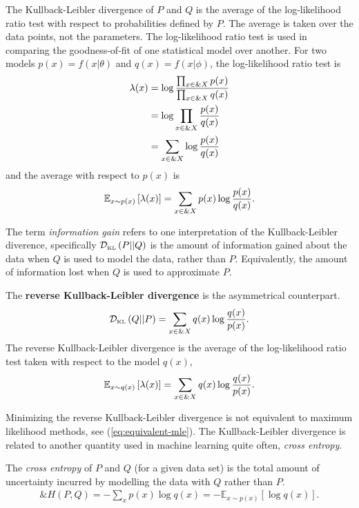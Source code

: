 \begin{remark}
  The Kullback-Leibler divergence of $P$ and $Q$ is the average of the
  log-likelihood ratio test with respect to probabilities defined by $P$. The
  average is taken over the data points, not the parameters. The log-likelihood
  ratio test is used in comparing the goodness-of-fit of one statistical model
  over another. For two models $p(x) = f(x|\theta)$ and $q(x) = f(x|\phi)$,
  the log-likelihood ratio test is
  \begin{align}
    \lambda(x) & = \log{\prod_{x \in \&X} p(x) \over \prod_{x \in \&X} q(x)} \\
               & = \log \prod_{x \in \&X} {p(x) \over q(x)} \\
               & = \sum_{x \in \&X} \log {p(x) \over q(x)}
  \end{align}
  and the average with respect to $p(x)$ is
  \begin{align}
    \mathbb{E}_{x \sim p(x)}\left[ \lambda(x) \right] = \sum_{x \in \&X} p(x)\log {p(x) \over q(x)}.
  \end{align}
\end{remark}
The term \textit{information gain} refers to one interpretation of the
Kullback-Leibler diverence, specifically $\mathcal{D}_{\text{\tiny KL}}\left( P \middle| \middle| Q \right)$ is the amount of
information gained about the data when $Q$ is used to model the data, rather
than $P$.  Equivalently, the amount of information lost when $Q$ is used to
approximate $P$.

\begin{definition}
  The \textbf{reverse Kullback-Leibler divergence} is the asymmetrical
  counterpart.
  \begin{align}
    \label{eq:reverse-KL}
    \mathcal{D}_{\text{\tiny KL}}\left( Q \middle| \middle| P \right) = \sum_{x \in \&X} q(x) \log{q(x) \over p(x)}.
  \end{align}
  The reverse Kullback-Leibler divergence is the average of the log-likelihood
  ratio test taken with respect to the model $q(x)$,
  \begin{align}
    \mathbb{E}_{x \sim q(x)}\left[ \lambda(x) \right] = \sum_{x \in \&X} q(x)\log {q(x) \over p(x)}.
  \end{align}
\end{definition}

Minimizing the reverse Kullback-Leibler divergence is not equivalent to maximum
likelihood methods, see (\ref{eq:equivalent-mle}). The Kullback-Leibler
divergence is related to another quantity used in machine learning quite often,
\textit{cross entropy}.

\begin{definition}
  The \textit{cross entropy} of $P$ and $Q$ (for a given data set) is the total
  amount of uncertainty incurred by modelling the data with $Q$ rather than $P$.
  \begin{align}
    \&H(P,Q) = - \sum_x p(x) \log q(x) = -\mathbb{E}_{x \sim p(x)}\left[\log{q(x)}\right].
  \end{align}
\end{definition}

